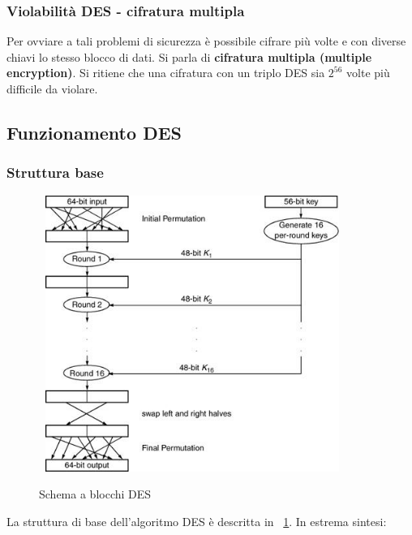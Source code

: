 \subsubsection{Violabilità DES - cifratura multipla}
Per ovviare a tali problemi di sicurezza è possibile cifrare più volte e con diverse chiavi lo stesso blocco di dati. Si parla di \textbf{cifratura multipla (multiple encryption)}. Si ritiene che una cifratura con un triplo DES sia
$2^{56}$ volte più difficile da violare.

\subsection{Funzionamento DES}
\subsubsection{Struttura base}
\begin{figure}[htbp]
	\centering%
	\subfigure%
	{\includegraphics[height=9cm, width=10cm, keepaspectratio]{Immagini/chiave_segreta/des_structure.png}}
	\caption{Schema a blocchi DES \label{fig:des_struct}} 	
\end{figure}
La struttura di base dell'algoritmo DES è descritta in \figurename ~\ref{fig:des_struct}. In estrema sintesi:
